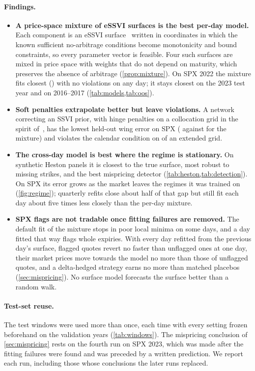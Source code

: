\paragraph{Findings.}
\begin{itemize}
  \item \textbf{A price-space mixture of eSSVI surfaces is the best per-day model.} Each component
  is an eSSVI surface~\citep{hendriks2019} written in coordinates in which the known sufficient
  no-arbitrage conditions become monotonicity and bound constraints, so every parameter vector is
  feasible. Four such surfaces are mixed in price space with weights that do not depend on
  maturity, which preserves the absence of arbitrage (\cref{prop:mixture}). On SPX 2022 the mixture
  fits closest (\mixFitVal\vp) with no violations on any day; it stays closest on the 2023 test year
  and on 2016--2017 (\cref{tab:models,tab:oos}).
  \item \textbf{Soft penalties extrapolate better but leave violations.} A network correcting an SSVI
  prior, with hinge penalties on a collocation grid in the spirit of~\citet{ackerer2020}, has the
  lowest held-out wing error on SPX (\pnnWingVal{} against \mixWingVal\vp{} for the mixture) and
  violates the calendar condition on \pnnCalVal{} of an extended grid.
  \item \textbf{The cross-day model is best where the regime is stationary.} On synthetic Heston
  panels it is closest to the true surface, most robust to missing strikes, and the best mispricing
  detector (\cref{tab:heston,tab:detection}). On SPX its error grows as the market leaves the
  regimes it was trained on (\cref{fig:regime}); quarterly refits close about half of that gap but
  still fit each day about five times less closely than the per-day mixture.
  \item \textbf{SPX flags are not tradable once fitting failures are removed.} The default fit of
  the mixture stops in poor local minima on some days, and a day fitted that way flags whole
  expiries. With every day refitted from the previous day's surface, flagged quotes revert no
  faster than unflagged ones at one day, their market prices move towards the model no more than
  those of unflagged quotes, and a delta-hedged strategy earns no more than matched placebos
  (\cref{sec:mispricing}). No surface model forecasts the surface better than a random walk.
\end{itemize}

\paragraph{Test-set reuse.} The test windows were used more than once, each time with every
setting frozen beforehand on the validation years (\cref{tab:windows}). The mispricing conclusion
of \cref{sec:mispricing} rests on the fourth run on SPX 2023, which was made after the fitting
failures were found and was preceded by a written prediction. We report each run, including those
whose conclusions the later runs replaced.

